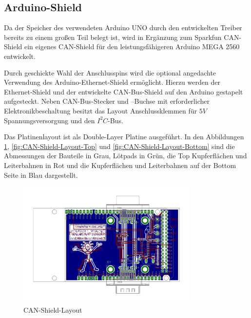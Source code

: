 \subsection{Arduino-Shield}
\label{sec:Arduino-Shield}
Da der Speicher des verwendeten Arduino UNO durch den entwickelten Treiber bereits zu einem großen Teil belegt ist, wird in Ergänzung zum Sparkfun CAN-Shield ein eigenes CAN-Shield für den leistungsfähigeren Arduino MEGA 2560 entwickelt.

Durch geschickte Wahl der Anschlusspins wird die optional angedachte Verwendung des Arduino-Ethernet-Shield ermöglicht. Hierzu werden der Ethernet-Shield und der entwickelte CAN-Bus-Shield auf den Arduino gestapelt aufgesteckt. Neben CAN-Bus-Stecker und –Buchse mit erforderlicher Elektronikbeschaltung besitzt das Layout Anschlussklemmen für $5V$ Spannungsversorgung und den $I^{2}C$-Bus.

Das Platinenlayout ist als Double-Layer Platine ausgeführt. In den Abbildungen \ref{fig:CAN-Shield-Layout}, \ref{fig:CAN-Shield-Layout-Top} und \ref{fig:CAN-Shield-Layout-Bottom}
sind die Abmessungen der Bauteile in Grau, Lötpads in Grün, die Top Kupferflächen und Leiterbahnen in Rot und die Kupferflächen und Leiterbahnen auf der Bottom Seite in Blau dargestellt.

\begin{figure}[H]
\centering
 \includegraphics[width=0.8\textwidth]{Abbildungen/CAN-Shield-Layout}
\caption[CAN-Shield-Layout]{CAN-Shield-Layout}
\label{fig:CAN-Shield-Layout}
\end{figure}

